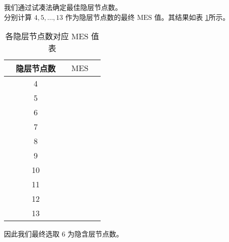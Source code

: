     我们通过试凑法确定最佳隐层节点数。\\
    分别计算 $4,5,\dots,13$ 作为隐层节点数的最终 $\mathrm{MES}$ 值。其结果如表 \ref{tab:yincenjiedian}所示。
    \begin{table}[htb]
      \centering
      \caption{各隐层节点数对应 $\mathrm{MES}$ 值表}
      \begin{tabular*}{0.618\paperwidth}{@{\extracolsep{\fill}}ccccc}
        \toprule[1.5pt]
        &隐层节点数 && $\mathrm{MES}$ &\\
        \midrule[1pt]
        &4 && &\\
        &5 && &\\
        &6 && &\\
        &7 && &\\
        &8 && &\\
        &9 && &\\
        &10 && &\\
        &11 && &\\
        &12 && &\\
        &13 && &\\
        \bottomrule[1.5pt]
      \end{tabular*}
      \label{tab:yincenjiedian}
    \end{table}

    因此我们最终选取 6 为隐含层节点数。